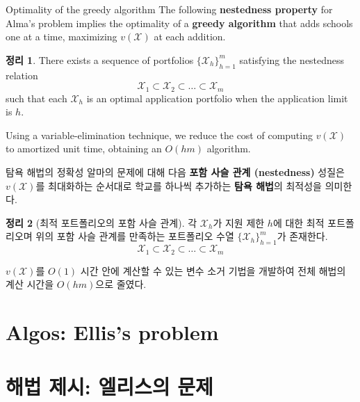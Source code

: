 \documentclass[11pt,mathserif,notheorems]{beamer}
\newtheorem{theorem}{Theorem}
\theoremstyle{definition}
\newtheorem{theorem}{정리}
\theoremstyle{definition}
\begin{document}
\ifen
\begin{frame}{Optimality of the greedy algorithm}
The following \textbf{nestedness property} for Alma's problem implies the optimality of a \textbf{greedy algorithm} that adds schools one at a time, maximizing $v(\mathcal{X})$ at each addition.
\begin{theorem}\label{nestedapplication}
There exists a sequence of portfolios $\{\mathcal{X}_h\}_{h=1}^m$ satisfying the nestedness relation
\begin{equation*}
\mathcal{X}_1 \subset \mathcal{X}_2\subset \dots \subset \mathcal{X}_m
\end{equation*}
such that each $\mathcal{X}_h$ is an optimal application portfolio when the application limit is $h$.
\end{theorem}

Using a variable-elimination technique, we reduce the cost of computing $v(\mathcal{X})$ to amortized unit time, obtaining an $O(hm)$ algorithm.
\end{frame}
\else
\begin{frame}{탐욕 해법의 정확성}
알마의 문제에 대해 다음 \textbf{포함 사슬 관계 (nestedness)} 성질은 $v(\mathcal{X})$를 최대화하는 순서대로 학교를 하나씩 추가하는 \textbf{탐욕 해법}의 최적성을 의미한다.
\begin{theorem}[최적 포트폴리오의 포함 사슬 관계] \label{nestedapplication}
각 $\mathcal{X}_h$가 지원 제한 $h$에 대한 최적 포트폴리오며 위의 포함 사슬 관계를 만족하는 포트폴리오 수열  $\{\mathcal{X}_h\}_{h=1}^m$가 존재한다.
\begin{equation*}
\mathcal{X}_1 \subset \mathcal{X}_2\subset \dots \subset \mathcal{X}_m
\end{equation*}
\end{theorem}

$v(\mathcal{X})$를 $O(1)$ 시간 안에 계산할 수 있는 변수 소거 기법을 개발하여 전체 해법의 계산 시간을 $O(hm)$으로 줄였다. 
\end{frame}
\fi






\ifen \section{Algos: Ellis's problem} \else \section{해법 제시: 엘리스의 문제} \fi
\end{document}
